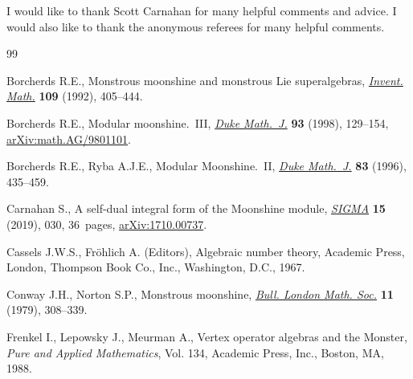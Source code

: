 \documentclass[10pt,a4paper]{amsart}
\numberwithin{equation}{section}
\begin{document}
I would like to thank Scott Carnahan for many helpful comments and advice. I would also like to thank the anonymous referees for many helpful comments.


\begin{thebibliography}{99}
\footnotesize\itemsep=0pt

Borcherds R.E., Monstrous moonshine and monstrous {L}ie superalgebras,
 \href{https://doi.org/10.1007/BF01232032}{\textit{Invent. Math.}} \textbf{109} (1992), 405--444.

Borcherds R.E., Modular moonshine.~{III}, \href{https://doi.org/10.1215/S0012-7094-98-09305-X}{\textit{Duke Math.~J.}} \textbf{93}
 (1998), 129--154, \href{https://arxiv.org/abs/math.AG/9801101}{arXiv:math.AG/9801101}.

Borcherds R.E., Ryba A.J.E., Modular {M}oonshine.~{II}, \href{https://doi.org/10.1215/S0012-7094-96-08315-5}{\textit{Duke Math.~J.}}
 \textbf{83} (1996), 435--459.

Carnahan S., A self-dual integral form of the {M}oonshine module,
 \href{https://doi.org/10.3842/SIGMA.2019.030}{\textit{SIGMA}} \textbf{15} (2019), 030, 36~pages, \href{https://arxiv.org/abs/1710.00737}{arXiv:1710.00737}.

Cassels J.W.S., Fr\"ohlich A. (Editors), Algebraic number theory, Academic
 Press, London, Thompson Book Co., Inc., Washington, D.C., 1967.

Conway J.H., Norton S.P., Monstrous moonshine, \href{https://doi.org/10.1112/blms/11.3.308}{\textit{Bull. London Math. Soc.}}
 \textbf{11} (1979), 308--339.

Frenkel I., Lepowsky J., Meurman A., Vertex operator algebras and the
 {M}onster, \textit{Pure and Applied Mathematics}, Vol. 134, Academic Press,
 Inc., Boston, MA, 1988.

\end{thebibliography}
\end{document}
